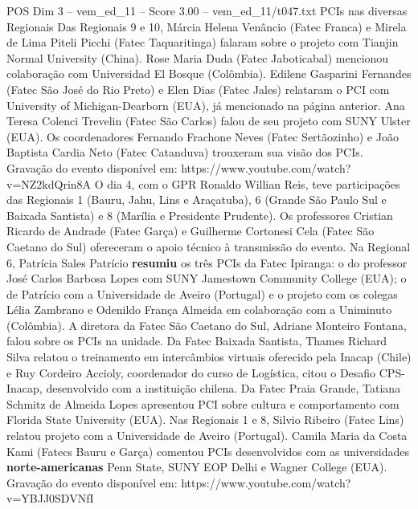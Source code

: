 \begin{textsample}{POS Dim 3 – vem\_ed\_11 – Score 3.00 – vem\_ed\_11/t047.txt}  \label{ex:f3_pos_140}
PCIs nas diversas Regionais Das Regionais 9 e 10, Márcia Helena Venâncio (Fatec Franca) e Mirela de Lima Piteli Picchi (Fatec Taquaritinga) falaram sobre o projeto com Tianjin Normal University (China).
Rose Maria Duda (Fatec Jaboticabal) mencionou colaboração com Universidad El Bosque (Colômbia).
Edilene Gasparini Fernandes (Fatec São José do Rio Preto) e Elen Dias (Fatec Jales) relataram o PCI com University of Michigan-Dearborn (EUA), já mencionado na página anterior.
Ana Teresa Colenci Trevelin (Fatec São Carlos) falou de seu projeto com SUNY Ulster (EUA).
Os coordenadores Fernando Frachone Neves (Fatec Sertãozinho) e João Baptista Cardia Neto (Fatec Catanduva) trouxeram sua visão dos PCIs.
Gravação do evento disponível em: https://www.youtube.com/watch?v=NZ2kdQrin8A O dia 4, com o GPR Ronaldo Willian Reis, teve participações das Regionais 1 (Bauru, Jahu, Lins e Araçatuba), 6 (Grande São Paulo Sul e Baixada Santista) e 8 (Marília e Presidente Prudente).
Os professores Cristian Ricardo de Andrade (Fatec Garça) e Guilherme Cortonesi Cela (Fatec São Caetano do Sul) ofereceram o apoio técnico à transmissão do evento.
Na Regional 6, Patrícia Sales Patrício \textbf{resumiu} os três PCIs da Fatec Ipiranga: o do professor José Carlos Barbosa Lopes com SUNY Jamestown Community College (EUA); o de Patrício com a Universidade de Aveiro (Portugal) e o projeto com os colegas Lélia Zambrano e Odenildo França Almeida em colaboração com a Uniminuto (Colômbia).
A diretora da Fatec São Caetano do Sul, Adriane Monteiro Fontana, falou sobre os PCIs na unidade.
Da Fatec Baixada Santista, Thames Richard Silva relatou o treinamento em intercâmbios virtuais oferecido pela Inacap (Chile) e Ruy Cordeiro Accioly, coordenador do curso de Logística, citou o Desafio CPS-Inacap, desenvolvido com a instituição chilena.
Da Fatec Praia Grande, Tatiana Schmitz de Almeida Lopes apresentou PCI sobre cultura e comportamento com Florida State University (EUA).
Nas Regionais 1 e 8, Silvio Ribeiro (Fatec Lins) relatou projeto com a Universidade de Aveiro (Portugal).
Camila Maria da Costa Kami (Fatecs Bauru e Garça) comentou PCIs desenvolvidos com as universidades \textbf{norte-americanas} Penn State, SUNY EOP Delhi e Wagner College (EUA).
Gravação do evento disponível em: https://www.youtube.com/watch?v=YBJJ0SDVNfI

\end{textsample}
